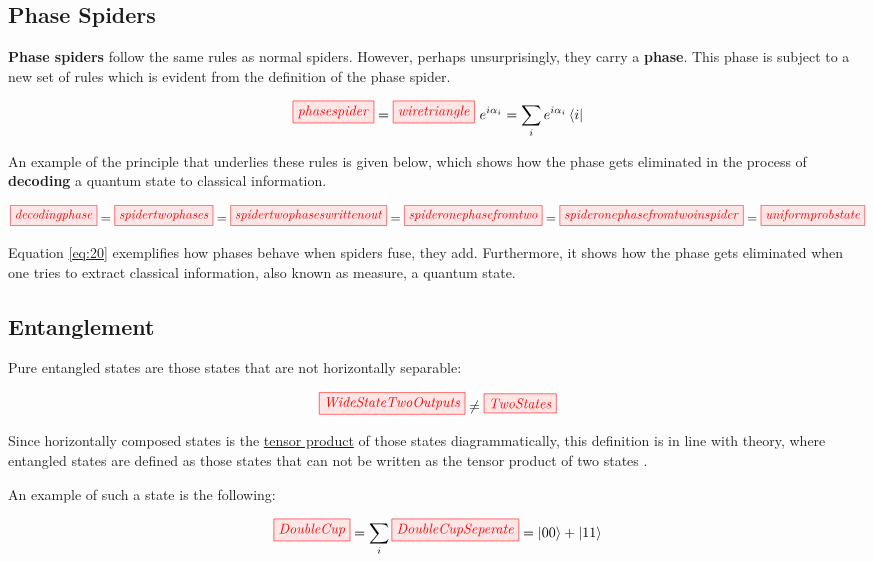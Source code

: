 \documentclass[]{article}
\begin{document}
\subsection{Phase Spiders}
\label{phasespiders}

\textbf{Phase spiders} follow the same rules as normal spiders. However, perhaps unsurprisingly, they carry a \textbf{phase}. This phase is subject to a new set of rules which is evident from the definition of the phase spider. 

\begin{equation}
\label{phasespider}
\tikzfig{phasespider} = \tikzfig{wiretriangle}~e^{i\alpha_i} = \sum\limits_i e^{i\alpha_i} \bra{i}
\end{equation}

An example of the principle that underlies these rules is given below, which shows how the phase gets eliminated in the process of \textbf{decoding} a quantum state to classical information.


\begin{equation}
\label{eq:20}
\tikzfig{decodingphase} = \tikzfig{spidertwophases} = \tikzfig{spidertwophaseswrittenout} = \tikzfig{spideronephasefromtwo} = \tikzfig{spideronephasefromtwoinspider} =
\tikzfig{uniformprobstate}
\end{equation}

Equation \eqref{eq:20} exemplifies how phases behave when spiders fuse, they add. Furthermore, it shows how the phase gets eliminated when one tries to extract classical information, also known as measure, a quantum state.

\subsection{Entanglement}
\label{entanglement}
Pure entangled states are those states that are not horizontally separable: 

\begin{equation}
\tikzfig{WideStateTwoOutputs} \neq \tikzfig{TwoStates}
\end{equation}

Since horizontally composed states is the \hyperref[doubling]{tensor product} of those states diagrammatically, this definition is in line with theory, where entangled states are defined as those states that can not be written as the tensor product of two states \cite{nielsen2011}. 

An example of such a state is the following:

\begin{equation}
\tikzfig{DoubleCup} = \sum\limits_{i} \tikzfig{DoubleCupSeperate} = \ket{00} + \ket{11}
\end{equation}
\end{document}
